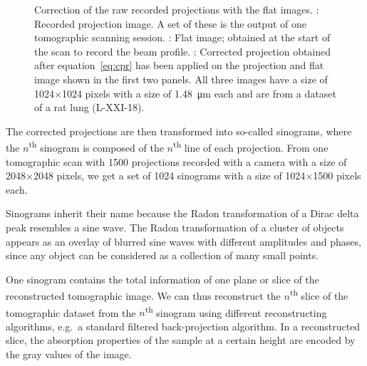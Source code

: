 \begin{figure}[h]
{%
		\label{subfig:cpr}%
		}%
	\caption[Correction of the projections with flat images]{Correction of the raw recorded projections with the flat images. : Recorded projection image. A set of these is the output of one tomographic scanning session. : Flat image; obtained at the start of the scan to record the beam profile. : Corrected projection obtained after equation~\ref{eq:cpr} has been applied on the projection and flat image shown in the first two panels. All three images have a size of 1024$\times$1024 pixels with a size of \SI{1.48}{\micro\meter} each and are from a dataset of a rat lung (L-XXI-18).}
	\label{fig:corrected projection}
\end{figure}

The corrected projections are then transformed into so-called sinograms, where the $n$\textsuperscript{th} sinogram is composed of the $n$\textsuperscript{th} line of each projection. From one tomographic scan with 1500 projections recorded with a camera with a size of 2048$\times$2048 pixels, we get a set of 1024 sinograms with a size of 1024$\times$1500 pixels each.

Sinograms inherit their name because the Radon transformation of a Dirac delta peak resembles a sine wave. The Radon transformation of a cluster of objects appears as an overlay of blurred sine waves with different amplitudes and phases, since any object can be considered as a collection of many small points.

One sinogram contains the total information of one plane or slice of the reconstructed tomographic image. We can thus reconstruct the $n$\textsuperscript{th} slice of the tomographic dataset from the $n$\textsuperscript{th} sinogram using different reconstructing algorithms, e.g.\ a standard filtered back-projection algorithm. In a reconstructed slice, the absorption properties of the sample at a certain height are encoded by the gray values of the image.

